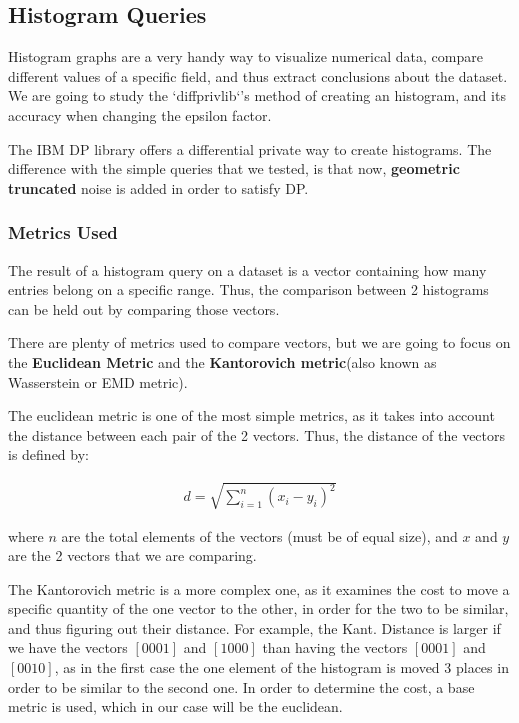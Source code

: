 \subsection{Histogram Queries}

Histogram graphs are a very handy way to visualize numerical data, compare different values of a specific field, and thus extract conclusions about the dataset. We are going to study the `diffprivlib`'s method of creating an histogram, and its accuracy when changing the epsilon factor.

The IBM DP library offers a differential private way to create histograms. The difference with the simple queries that we tested, is that now, \textbf{geometric truncated} noise is added in order to satisfy DP.

\subsubsection{Metrics Used}
The result of a histogram query on a dataset is a vector containing how many entries belong on a specific range. Thus, the comparison between 2 histograms can be held out by comparing those vectors. 

There are plenty of metrics used to compare vectors, but we are going to focus on the \textbf{Euclidean Metric} and the \textbf{Kantorovich metric}(also known as Wasserstein or EMD metric). 

The euclidean metric is one of the most simple metrics, as it takes into account the distance between each pair of the 2 vectors. Thus, the distance of the vectors is defined by:

\begin{align*}
    d = \sqrt{\sum_{i=1}^n (x_i - y_i) ^ 2}
\end{align*}

where $n$ are the total elements of the vectors (must be of equal size), and $x$ and $y$ are the 2 vectors that we are comparing.

The Kantorovich metric is a more complex one, as it examines the cost to move a specific quantity of the one vector to the other, in order for the two to be similar, and thus figuring out their distance. For example, the Kant. Distance is larger if we have the vectors $[0 0 0 1]$ and $[1 0 0 0]$ than having the vectors $[0 0 0 1]$ and $[0 0 1 0]$, as in the first case the one element of the histogram is moved 3 places in order to be similar to the second one. In order to determine the cost, a base metric is used, which in our case will be the euclidean.

